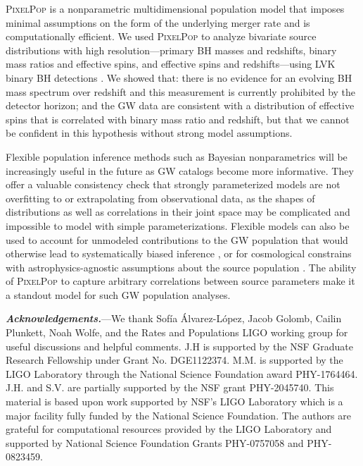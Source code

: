 \documentclass[%
 reprint,
 amsmath,amssymb,
 aps,
 prd,
 nofootinbib,nobibnotes,
]{revtex4-2}
\newcommand{\heading}[1]{\textbf{\textit{#1.}}}
\begin{document}
\textsc{PixelPop} \cite{Heinzel:2024jlc} is a nonparametric multidimensional population model that imposes minimal assumptions on the form of the underlying merger rate and is computationally efficient. We used \textsc{PixelPop} to analyze bivariate source distributions with high resolution---primary BH masses and redshifts, binary mass ratios and effective spins, and effective spins and redshifts---using LVK binary BH detections \cite{LIGOScientific:2018mvr, LIGOScientific:2020ibl, LIGOScientific:2021usb, LIGOScientific:2021djp}. We showed that: there is no evidence for an evolving BH mass spectrum over redshift and this measurement is currently prohibited by the detector horizon; and the GW data are consistent with a distribution of effective spins that is correlated with binary mass ratio and redshift, but that we cannot be confident in this hypothesis without strong model assumptions.

Flexible population inference methods such as Bayesian nonparametrics will be increasingly useful in the future as GW catalogs become more informative. They offer a valuable consistency check that strongly parameterized models are not overfitting to or extrapolating from observational data, as the shapes of distributions as well as correlations in their joint space may be complicated and impossible to model with simple parameterizations. Flexible models can also be used to account for unmodeled contributions to the GW population that would otherwise lead to systematically biased inference \cite{Cheng:2023ddt}, or for cosmological constrains with astrophysics-agnostic assumptions about the source population \cite{MaganaHernandez:2024uty, Farah:2024xub}. The ability of \textsc{PixelPop} to capture arbitrary correlations between source parameters make it a standout model for such GW population analyses.

\heading{Acknowledgements}---We thank Sofía Álvarez-López, Jacob Golomb, Cailin Plunkett, Noah Wolfe, and the Rates and Populations LIGO working group for useful discussions and helpful comments.
%
J.H is supported by the NSF Graduate Research Fellowship under Grant No. DGE1122374.
%
M.M. is supported by the LIGO Laboratory through the National Science Foundation award PHY-1764464.
%
J.H. and S.V. are partially supported by the NSF grant PHY-2045740.
%
This material is based upon work supported by NSF's LIGO Laboratory which is a major facility fully funded by the National Science Foundation.
%
The authors are grateful for computational resources provided by the LIGO Laboratory and supported by National Science Foundation Grants PHY-0757058 and PHY-0823459.
\end{document}
